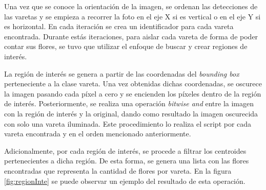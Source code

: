 Una vez que se conoce la orientación de la imagen, se ordenan las detecciones de las varetas y se empieza a recorrer la foto en el eje X si es vertical o en el eje Y si es horizontal. En cada iteración se crea un identificador para cada vareta encontrada. Durante estás iteraciones, para aislar cada vareta de forma de poder contar sus flores, se tuvo que utilizar el enfoque de buscar y crear regiones de interés.

La región de interés se genera a partir de las coordenadas del \textit{bounding box} perteneciente a la clase vareta. Una vez obtenidas dichas coordenadas, se oscurece la imagen pasando cada píxel a cero y se encienden los píxeles dentro de la región de interés. Posteriormente, se realiza una operación \textit{bitwise and} entre la imagen con la región de interés y la original, dando como resultado la imagen oscurecida con solo una vareta iluminada. Este procedimiento lo realiza el script por cada vareta encontrada y en el orden mencionado anteriormente.

Adicionalmente, por cada región de interés, se procede a filtrar los centroides pertenecientes a dicha región. De esta forma, se genera una lista con las flores encontradas que representa la cantidad de flores por vareta. En la figura \ref{fig:regionInte} se puede observar un ejemplo del resultado de esta operación. 


